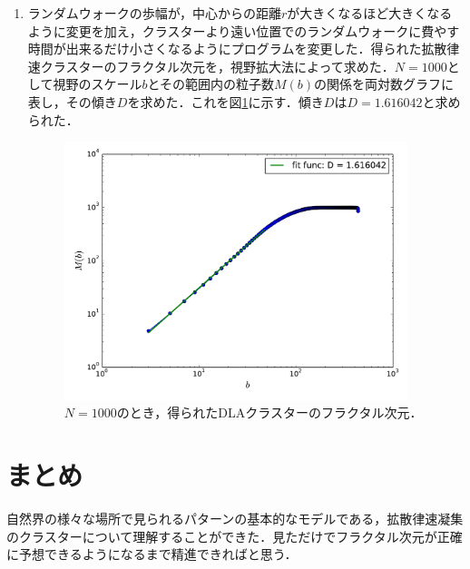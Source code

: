 \documentclass{jsarticle}
\begin{document}
\begin{enumerate}
            \begin{enumerate}
                \item ランダムウォークの歩幅が，中心からの距離$r$が大きくなるほど大きくなるように変更を加え，クラスターより遠い位置でのランダムウォークに費やす時間が出来るだけ小さくなるようにプログラムを変更した．得られた拡散律速クラスターのフラクタル次元を，視野拡大法によって求めた．$N=1000$として視野のスケール$b$とその範囲内の粒子数$M(b)$の関係を両対数グラフに表し，その傾き$D$を求めた．これを図\ref{fig:14-9-f3}に示す．傾き$D$は$D=1.616042$と求められた．
                
                \begin{figure}[H]
                    \begin{center}
                        \includegraphics[width=10cm]{figure_4.pdf}
                        \caption{$N=1000$のとき，得られたDLAクラスターのフラクタル次元．}
                        \label{fig:14-9-f3}
                    \end{center}
                \end{figure}
                
            \end{enumerate}
    \end{enumerate}

\section{まとめ}
    自然界の様々な場所で見られるパターンの基本的なモデルである，拡散律速凝集のクラスターについて理解することができた．見ただけでフラクタル次元が正確に予想できるようになるまで精進できればと思う．



\end{document}

